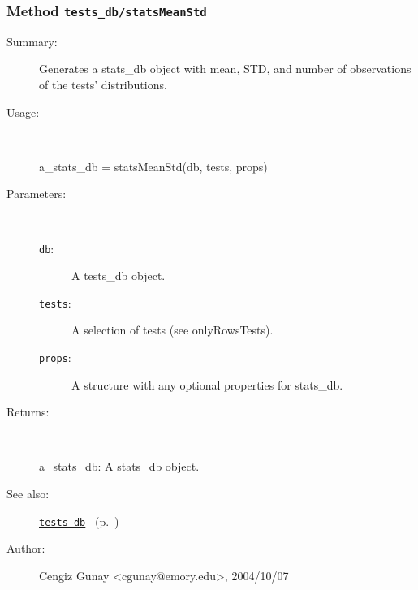 \subsubsection[Method \texttt{statsMeanStd}]{Method \texttt{tests\_db/statsMeanStd}}%
%
\label{ref_tests_db__statsMeanStd}%
\hypertarget{ref_tests_db__statsMeanStd}{}%
\begin{description}
\item[Summary:]Generates a stats\_db object with mean, STD, and number of observations of the tests' distributions.
%
\item[Usage:]~%
\begin{lyxcode}%
a\_stats\_db = statsMeanStd(db, tests, props)
%
\end{lyxcode}%
%
%
\item[Parameters:]~
\begin{description}%
\item[\texttt{db}:]
 A tests\_db object.
\item[\texttt{tests}:]
 A selection of tests (see onlyRowsTests).
\item[\texttt{props}:]
 A structure with any optional properties for stats\_db.
\end{description}%
%
\item[Returns:
]~

	a\_stats\_db: A stats\_db object.
%
%
\item[See also:]%
\hyperlink{ref_tests_db}{\texttt{tests\_db}}%
\ (p.~\pageref{ref_tests_db})%
%
%
\item[Author:]%
Cengiz Gunay <cgunay@emory.edu>, 2004/10/07
%
\end{description}
\methodline%
